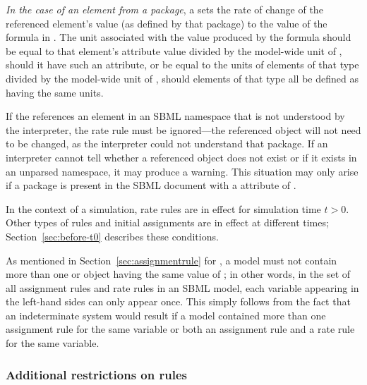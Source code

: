 \begin{itemize}
\begin{blockChanged}
\item \emph{In the case of an element from a package}, a \RateRule sets the rate of change of the referenced element's value (as defined by that package) to the value of the formula in .  The unit associated with the value produced by the formula should be equal to that element's  attribute value divided by the model-wide unit of , should it have such an attribute, or be equal to the units of elements of that type divided by the model-wide unit of , should elements of that type all be defined as having the same units.
\end{blockChanged}

\end{itemize}

\begin{blockChanged}
If the  references an element in an SBML namespace that is not
  understood by the interpreter, the rate rule must be ignored---the 
  referenced object will not need to be changed, as the interpreter could not
  understand that package.  If an interpreter cannot tell whether 
  a referenced object does not exist or if it exists in an unparsed namespace,
  it may produce a warning.  This situation may only arise if a package is present in the SBML document with a  attribute of .
\end{blockChanged}


In the context of a simulation, rate rules are in effect for
simulation time $t > 0$.  Other types of rules and initial
assignments are in effect at different times;
Section~\ref{sec:before-t0} describes these conditions.

As mentioned in Section~\ref{sec:assignmentrule} for
\AssignmentRule, a model must not contain more than one \RateRule
or \AssignmentRule object having the same value of
; in other words, in the set of all assignment
rules and rate rules in an SBML model, each variable appearing in
the left-hand sides can only appear once.  This simply follows
from the fact that an indeterminate system would result if a model
contained more than one assignment rule for the same variable or
both an assignment rule and a rate rule for the same variable.


\subsubsection{Additional restrictions on rules}
\label{sec:ruleconstraints}

